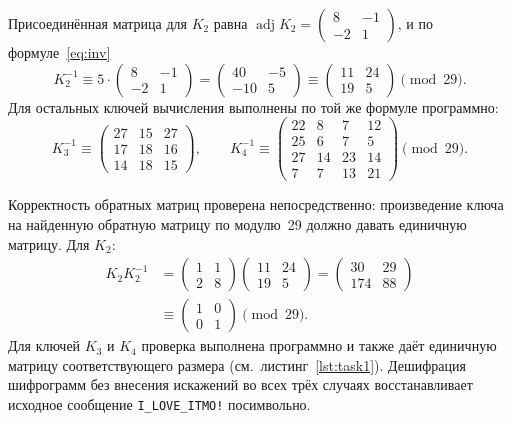 \documentclass[a4paper,14pt]{extarticle}
\begin{document}
Присоединённая матрица для $K_2$ равна $\operatorname{adj} K_2 = \begin{pmatrix} 8 & -1 \\ -2 & 1 \end{pmatrix}$,
и по формуле~\eqref{eq:inv}
\begin{equation}
  K_2^{-1} \equiv 5 \cdot \begin{pmatrix} 8 & -1 \\ -2 & 1 \end{pmatrix} = \begin{pmatrix} 40 & -5 \\ -10 & 5 \end{pmatrix} \equiv \begin{pmatrix} 11 & 24 \\ 19 & 5 \end{pmatrix} \pmod{29}.
\end{equation}
Для остальных ключей вычисления выполнены по той же формуле программно:
\begin{equation}
  K_3^{-1} \equiv \begin{pmatrix} 27 & 15 & 27 \\ 17 & 18 & 16 \\ 14 & 18 & 15 \end{pmatrix}, \qquad K_4^{-1} \equiv \begin{pmatrix} 22 & 8 & 7 & 12 \\ 25 & 6 & 7 & 5 \\ 27 & 14 & 23 & 14 \\ 7 & 7 & 13 & 21 \end{pmatrix} \pmod{29}.
\end{equation}

Корректность обратных матриц проверена непосредственно: произведение ключа на
найденную обратную матрицу по модулю~29 должно давать единичную матрицу. Для $K_2$:
\begin{equation}
\begin{aligned}
  K_2 K_2^{-1} &= \begin{pmatrix} 1 & 1 \\ 2 & 8 \end{pmatrix}\begin{pmatrix} 11 & 24 \\ 19 & 5 \end{pmatrix} = \begin{pmatrix} 30 & 29 \\ 174 & 88 \end{pmatrix} \\
  &\equiv \begin{pmatrix} 1 & 0 \\ 0 & 1 \end{pmatrix} \pmod{29}.
\end{aligned}
\end{equation}
Для ключей $K_3$ и $K_4$ проверка выполнена программно и также даёт единичную
матрицу соответствующего размера (см.~листинг~\ref{lst:task1}).
Дешифрация шифрограмм без внесения искажений во всех трёх случаях восстанавливает
исходное сообщение \texttt{I\_LOVE\_ITMO!} посимвольно.
\end{document}

